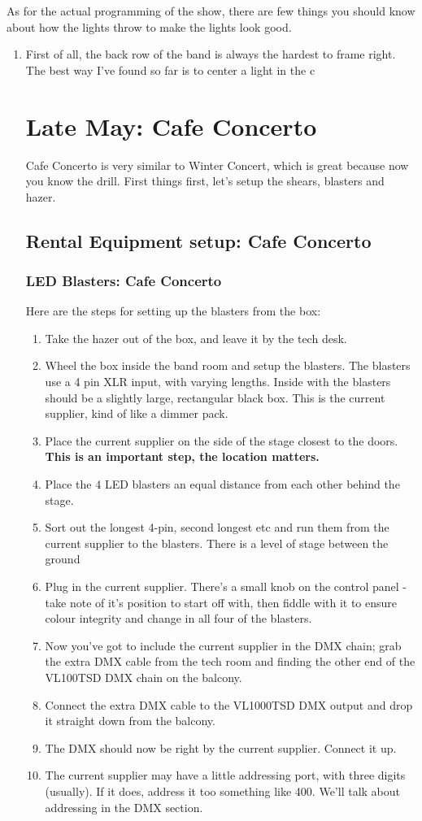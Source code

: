 \documentclass[11pt,a4paper]{book}
\begin{document}
As for the actual programming of the show, there are few things you should know about how the lights throw to make the lights look good. 

\begin{enumerate}
\item First of all, the back row of the band is always the hardest to frame right. The best way I've found so far is to center a light in the c\chapter{Late May: Cafe Concerto}
Cafe Concerto is very similar to Winter Concert, which is great because now you know the drill. First things first, let's setup the shears, blasters and hazer.
\section{Rental Equipment setup: Cafe Concerto}

\subsection{LED Blasters: Cafe Concerto}
Here are the steps for setting up the blasters from the box:
\begin{enumerate}
\item Take the hazer out of the box, and leave it by the tech desk.
\item Wheel the box inside the band room and setup the blasters. The blasters use a 4 pin XLR input, with varying lengths. Inside with the blasters should be a slightly large, rectangular black box. This is the current supplier, kind of like a dimmer pack.
\item Place the current supplier on the side of the stage closest to the doors. \textbf{This is an important step, the location matters.}
\item Place the 4 LED blasters an equal distance from each other behind the stage. 
\item Sort out the longest 4-pin, second longest etc and run them from the current supplier to the blasters. There is a level of stage between the ground
\item Plug in the current supplier. There's a small knob on the control panel - take note of it's position to start off with, then fiddle with it to ensure colour integrity and change in all four of the blasters. 
\item Now you've got to include the current supplier in the DMX chain; grab the extra DMX cable from the tech room and finding the other end of the VL100TSD DMX chain on the balcony.
\item Connect the extra DMX cable to the VL1000TSD DMX output and drop it straight down from the balcony.
\item The DMX should now be right by the current supplier. Connect it up.
\item The current supplier may have a little addressing port, with three digits (usually). If it does, address it too something like 400. We'll talk about addressing in the DMX section.
\end{enumerate}

\end{enumerate}
\end{document}

